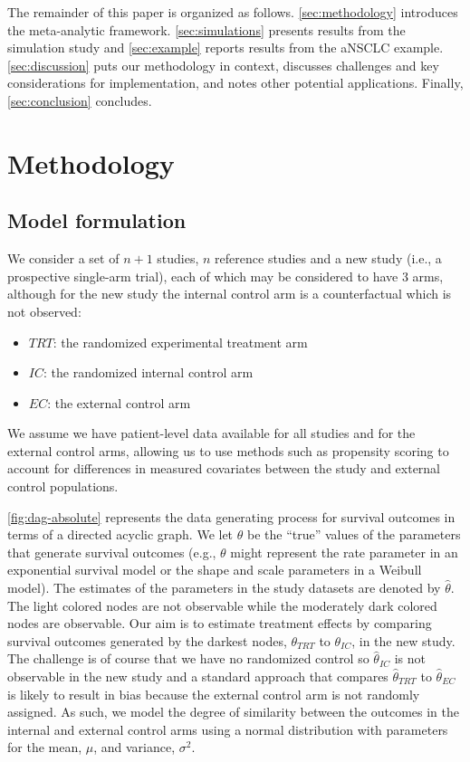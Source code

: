 \documentclass[11pt,final,fleqn]{article}\usepackage[]{graphicx}\usepackage[]{color}
\begin{document}
The remainder of this paper is organized as follows. \autoref{sec:methodology} introduces the meta-analytic framework. \autoref{sec:simulations} presents results from the simulation study and \autoref{sec:example} reports results from the aNSCLC example. \autoref{sec:discussion} puts our methodology in context,  discusses challenges and key considerations for implementation, and notes other potential applications. Finally, \autoref{sec:conclusion} concludes. 

\section{Methodology} \label{sec:methodology}

\subsection{Model formulation}
We consider a set of $n+1$ studies, $n$ reference studies and a new study (i.e., a prospective single-arm trial), each of which may be considered to have 3 arms, although for the new study the internal control arm is a counterfactual which is not observed:

\begin{itemize}
\item $\textit{TRT}$: the randomized experimental treatment arm
\item $IC$: the randomized internal control arm
\item $EC$: the external control arm
\end{itemize}

We assume we have patient-level data available for all studies and for the external control arms, allowing us to use methods such as propensity scoring to account for differences in measured covariates between the study and external control populations.  

\autoref{fig:dag-absolute} represents the data generating process for survival outcomes in terms of a directed acyclic graph. We let $\theta$ be the ``true'' values of the parameters that generate survival outcomes (e.g., $\theta$ might represent the rate parameter in an exponential survival model or the shape and scale parameters in a Weibull model). The estimates of the parameters in the study datasets are denoted by $\hat{\theta}$. The light colored nodes are not observable while the moderately dark colored nodes are observable. Our aim is to estimate treatment effects by comparing survival outcomes generated by the darkest nodes, $\theta_{\textit{TRT}}$ to $\theta_{IC}$, in the new study. The challenge is of course that we have no randomized control so $\hat{\theta}_{IC}$ is not observable in the new study and a standard approach that compares $\hat{\theta}_{\textit{TRT}}$  to $\hat{\theta}_{EC}$  is likely to result in bias because the external control arm is not randomly assigned. As such, we model the degree of similarity between the outcomes in the internal and external control arms using a normal distribution with parameters for the mean, $\mu$, and variance, $\sigma^2$. 
\end{document}
